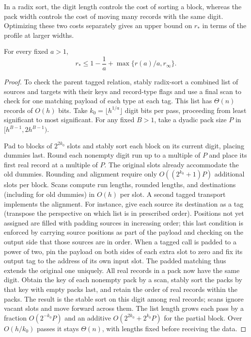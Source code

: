 In a radix sort, the digit length controls the cost of sorting a block,
whereas the pack width controls the cost of moving many records with
the same digit. Optimizing these two costs separately gives an upper
bound on $r_*$ in terms of the profile at larger widths.

\begin{proposition}\label{prop:tag-width-packing}
For every fixed $a>1$,
\[
 r_*\le 1-\frac1a+\max\{r(a)/a,r_\infty\}.
\]
\end{proposition}

\begin{proof}
To check the parent tagged relation, stably radix-sort a combined list
of sources and targets
with their keys and record-type flags and use a final scan to check for one
matching payload of each type at each tag. This list has $\Theta(n)$
records of $O(h)$ bits. Take $k_0=\lfloor h^{1/a}\rfloor$ digit bits per
pass, proceeding from least significant to most significant. For any
fixed $B>1$, take a dyadic pack size $P$ in $[h^{B-1},2h^{B-1})$.

Pad to blocks of $2^{2k_0}$ slots and stably sort each block on its
current digit, placing dummies last. Round each nonempty digit run up
to a multiple of $P$ and place its first real record at a multiple of
$P$. The original slots already accommodate the old dummies. Rounding and
alignment require only $O((2^{k_0}+1)P)$ additional slots per block. Scans compute run lengths, rounded
lengths, and destinations (including for old dummies) in $O(h)$ per slot. A second tagged transport implements the alignment. For instance, give each source its destination as a tag (transpose the perspective on which list is in prescribed order). Positions not yet assigned are filled with padding sources in increasing order; this last condition is enforced by carrying source positions as part of the payload and checking on the output side that those sources are in order. When a
tagged call is padded to a power of two, pin the payload on both sides
of each extra slot to zero and fix its output tag to the address of its
own input slot. The padded matching thus extends the original one
uniquely. All real records in a pack now have the same digit. Obtain the key of each nonempty pack
by a scan, stably sort the packs by that key with empty packs last, and
retain the order of real records within the packs. The result is the
stable sort on this digit among real records; scans ignore vacant slots and move forward across them. The list length grows each pass by a fraction
$O(2^{-k_0}P)$ and an additive $O(2^{2k_0}+2^{k_0}P)$ for the partial
block. Over $O(h/k_0)$ passes it stays $\Theta(n)$, with lengths fixed
before receiving the data.


\end{proof}
